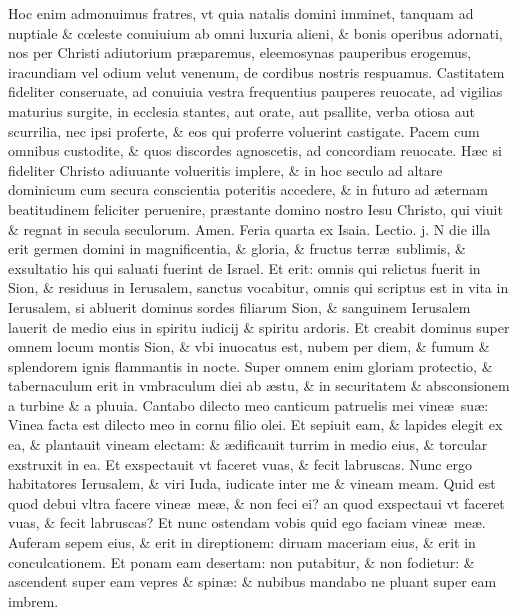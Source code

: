 \documentclass[a5paper,10pt]{book}
\def\ae{æ}
\def\oe{œ}
\begin{document}
\begin{multicols*}{2}
Hoc enim admonuimus fratres, vt quia natalis domini imminet, tanquam ad nuptiale \& c\oe leste conuiuium ab omni luxuria alieni, \& bonis operibus adornati, nos per Christi adiutorium pr\ae paremus, eleemosynas pauperibus erogemus, iracundiam vel odium velut venenum, de cordibus nostris respuamus.
Castitatem fideliter conseruate, ad conuiuia vestra frequentius pauperes reuocate, ad vigilias maturius surgite, in ecclesia stantes, aut orate, aut psallite, verba otiosa aut scurrilia, nec ipsi proferte, \& eos qui proferre voluerint castigate.
Pacem cum omnibus custodite, \& quos discordes agnoscetis, ad concordiam reuocate.
H\ae c si fideliter Christo adiuuante volueritis implere, \& in hoc seculo ad altare dominicum cum secura conscientia poteritis accedere, \& in futuro ad \ae ternam beatitudinem feliciter peruenire, pr\ae stante domino nostro Iesu Christo, qui viuit \& regnat in secula seculorum. Amen.
\newline {} \color{red} \hypertarget{WED-PRIMA-ADV}{Feria quarta} ex Isaia. \hfill Lectio. j. \color{black}
\vspace{-.5em}
N die illa erit germen domini in magnificentia, \& gloria, \& fructus terr\ae \ sublimis, \& exsultatio his qui saluati fuerint de Israel.
Et erit: omnis qui relictus fuerit in Sion, \& residuus in Ierusalem, sanctus vocabitur, omnis qui scriptus est in vita in Ierusalem, si abluerit dominus sordes filiarum Sion, \& sanguinem Ierusalem lauerit de medio eius in spiritu iudicij \& spiritu ardoris.
Et creabit dominus super omnem locum montis Sion, \& vbi inuocatus est, nubem per diem, \& fumum \& splendorem ignis flammantis in nocte.
Super omnem enim gloriam protectio, \& tabernaculum erit in vmbraculum diei ab \ae stu, \& in securitatem \& absconsionem a turbine \& a pluuia.
\newline \indent Cantabo dilecto meo canticum patruelis mei vine\ae \ su\ae : Vinea facta est dilecto meo in cornu filio olei.
Et sepiuit eam, \& lapides elegit ex ea, \& plantauit vineam electam: \& \ae dificauit turrim in medio eius, \& torcular exstruxit in ea. Et exspectauit vt faceret vuas, \& fecit labruscas.
Nunc ergo habitatores Ierusalem, \& viri Iuda, iudicate inter me \& vineam meam.
Quid est quod debui vltra facere vine\ae \ me\ae , \& non feci ei? an quod exspectaui vt faceret vuas, \& fecit labruscas?
Et nunc ostendam vobis quid ego faciam vine\ae \ me\ae .
Auferam sepem eius, \& erit in direptionem: diruam maceriam eius, \& erit in conculcationem.
Et ponam eam desertam: non putabitur, \& non fodietur: \& ascendent super eam vepres \& spin\ae : \& nubibus mandabo ne pluant super eam imbrem.

\end{multicols*}
\end{document}
